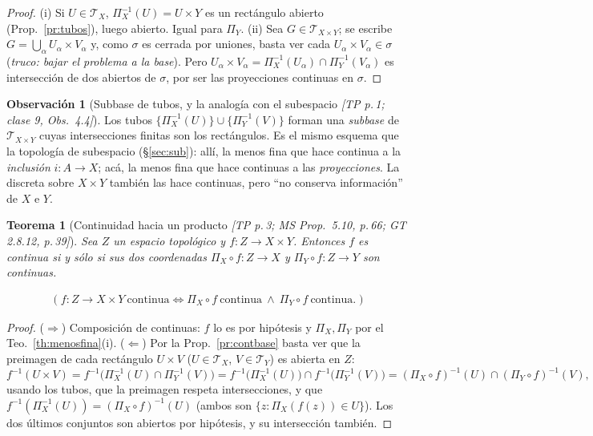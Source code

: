 \documentclass[11pt,a4paper]{article}
\newcommand{\lgc}[1]{\par\vspace{-3pt}\begin{gather*}\big(\;#1\;\big)\end{gather*}\vspace{-6pt}}
\theoremstyle{definition}
\newtheorem{observacion}[definicion]{Observación}
\theoremstyle{plain}
\newtheorem{teorema}[definicion]{Teorema}
\newcommand{\fnt}[1]{{\normalfont\small\itshape\color{gray!150!black}[#1]}}
\newcommand{\tp}{\mathcal{T}}
\begin{document}
\begin{proof}
(i) Si $U\in\tp_X$, $\Pi_X^{-1}(U)=U\times Y$ es un rectángulo abierto (Prop.~\ref{pr:tubos}), luego abierto. Igual para $\Pi_Y$.
(ii) Sea $G\in\tp_{X\times Y}$; se escribe $G=\bigcup_\alpha U_\alpha\times V_\alpha$ y, como $\sigma$ es cerrada por uniones, basta ver cada $U_\alpha\times V_\alpha\in\sigma$ (\emph{truco: bajar el problema a la base}). Pero $U_\alpha\times V_\alpha=\Pi_X^{-1}(U_\alpha)\cap\Pi_Y^{-1}(V_\alpha)$ es intersección de dos abiertos de $\sigma$, por ser las proyecciones continuas en $\sigma$.
\end{proof}

\begin{observacion}[Subbase de tubos, y la analogía con el subespacio \fnt{TP p.\,1; clase 9, Obs.\ 4.4}]
Los tubos $\{\Pi_X^{-1}(U)\}\cup\{\Pi_Y^{-1}(V)\}$ forman una \emph{subbase} de $\tp_{X\times Y}$ cuyas intersecciones finitas son los rectángulos. Es el mismo esquema que la topología de subespacio (\S\ref{sec:sub}): allí, la menos fina que hace continua a la \emph{inclusión} $i:A\to X$; acá, la menos fina que hace continuas a las \emph{proyecciones}. La discreta sobre $X\times Y$ también las hace continuas, pero ``no conserva información'' de $X$ e $Y$.
\end{observacion}

\begin{teorema}[Continuidad hacia un producto \fnt{TP p.\,3; MS Prop.\ 5.10, p.\,66; GT 2.8.12, p.\,39}]\label{th:contprod}
Sea $Z$ un espacio topológico y $f:Z\to X\times Y$. Entonces $f$ es continua si y sólo si sus dos coordenadas $\Pi_X\circ f:Z\to X$ y $\Pi_Y\circ f:Z\to Y$ son continuas.
\lgc{f:Z\to X\times Y\ \text{continua}\iff \Pi_X\circ f\ \text{continua}\ \wedge\ \Pi_Y\circ f\ \text{continua}.}
\end{teorema}

\begin{proof}
($\Rightarrow$) Composición de continuas: $f$ lo es por hipótesis y $\Pi_X,\Pi_Y$ por el Teo.~\ref{th:menosfina}(i).
($\Leftarrow$) Por la Prop.~\ref{pr:contbase} basta ver que la preimagen de cada rectángulo $U\times V$ ($U\in\tp_X$, $V\in\tp_Y$) es abierta en $Z$:
\[
f^{-1}(U\times V)=f^{-1}\big(\Pi_X^{-1}(U)\cap\Pi_Y^{-1}(V)\big)=f^{-1}\big(\Pi_X^{-1}(U)\big)\cap f^{-1}\big(\Pi_Y^{-1}(V)\big)=(\Pi_X\circ f)^{-1}(U)\cap(\Pi_Y\circ f)^{-1}(V),
\]
usando los tubos, que la preimagen respeta intersecciones, y que $f^{-1}(\Pi_X^{-1}(U))=(\Pi_X\circ f)^{-1}(U)$ (ambos son $\{z: \Pi_X(f(z))\in U\}$). Los dos últimos conjuntos son abiertos por hipótesis, y su intersección también.
\end{proof}
\end{document}
